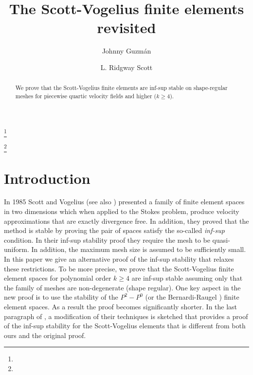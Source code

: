 \documentclass[11pt]{amsart}
\numberwithin{equation}{section}
\theoremstyle{definition}
\begin{document}
\title[Inf-Sup stability of unfitted Stokes  elements]{The Scott-Vogelius finite elements revisited}


\author[J. Guzm\'an]{Johnny Guzm\'an\textsuperscript{\textdagger}}
\address{\textsuperscript{\textdagger} Division of Applied Mathematics, Brown University, Providence, RI 02912, USA}
\thanks{}

\author[R. Scott]{L. Ridgway Scott\textsuperscript{\textdaggerdbl}}
\address{\textsuperscript{\textdaggerdbl}Departments of  Computer Science and Mathematics,
Committee on Computational and Applied Mathematics,
University of Chicago, Chicago IL 60637, USA}
\thanks{}

\maketitle

\begin{abstract}  
We prove that the Scott-Vogelius finite elements are inf-sup stable on 
shape-regular meshes for piecewise quartic velocity fields and higher ($k \ge 4$). 

\end{abstract}
\medskip

\keywords{}
\smallskip

\date{}

\section{Introduction}


In 1985 Scott and Vogelius \cite{scott1985norm} (see also \cite{vogelius1983right}) 
presented a family of finite element spaces in two dimensions which
when applied to the Stokes problem, produce velocity approximations that 
are exactly divergence free.  In addition, they proved that the method is stable by proving the pair of spaces satisfy the  so-called {\it  inf-sup}  condition.   In their inf-sup stability proof they require the mesh to be  quasi-uniform. In addition,  the maximum mesh size is assumed to be sufficiently small. In this paper we give an alternative proof of the inf-sup stability that relaxes these restrictions. To be more precise, we prove that the Scott-Vogelius finite element spaces for polynomial order $k \ge 4$ are inf-sup stable 
 assuming only that the family of meshes are 
non-degenerate (shape regular).  
One key aspect in the new proof is to use the stability of the $P^2-P^0$ (or the Bernardi-Raugel \cite{bernardi1985analysis}) finite element spaces. As a result the proof becomes significantly shorter.
In the last paragraph of \cite{falk2013stokes}, a modification
of their techniques is sketched that provides a proof of the inf-sup stability for
the Scott-Vogelius elements that is different from both ours and the original proof.
\end{document}
